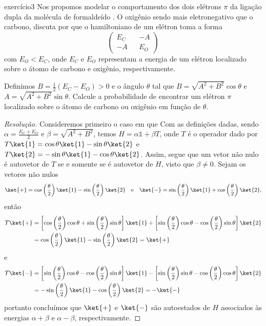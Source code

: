 \begin{exercício}{}{exercício3}
    Nos propomos modelar o comportamento dos dois elétrons \(\pi\) da ligação dupla da molécula de formaldeído . O oxigênio sendo mais eletronegativo que o carbono, discuta por que o hamiltoniano de um elétron toma a forma
    \begin{equation*}
        \begin{pmatrix}
            E_C && -A\\
            -A &&E_O
        \end{pmatrix}
    \end{equation*}
    com \(E_O < E_C\), onde \(E_C\) e \(E_O\) representam a energia de um elétron localizado sobre o átomo de carbono e oxigênio, respectivamente.

    Definimos \(B = \frac12 (E_C - E_O) > 0\) e o ângulo \(\theta\) tal que \(B = \sqrt{A^2 + B^2}\cos\theta\) e \(A = \sqrt{A^2 + B^2}\sin\theta\). Calcule a probabilidade de encontrar um elétron \(\pi\) localizado sobre o átomo de carbono ou oxigênio em função de \(\theta\).
\end{exercício}
\begin{proof}[Resolução]
    Consideremos primeiro o caso em que
    Com as definições dadas, sendo \(\alpha = \frac{E_C + E_O}{2}\) e \(\beta = \sqrt{A^2 + B^2}\), temos \(H = \alpha \mathds{1} + \beta T\), onde \(T\) é o operador dado por \(T\ket{1} = \cos\theta \ket{1} - \sin\theta \ket{2}\) e \(T\ket{2} = -\sin\theta\ket{1} - \cos\theta\ket{2}\). Assim, segue que um vetor não nulo é autovetor de \(T\) se e somente se é autovetor de \(H\), visto que \(\beta \neq 0\). Sejam os vetores não nulos
    \begin{equation*}
        \ket{+} = \cos\left(\frac{\theta}{2}\right)\ket{1} - \sin\left(\frac{\theta}{2}\right)\ket{2}
        \quad\text{e}\quad
        \ket{-} = \sin\left(\frac{\theta}{2}\right)\ket{1} + \cos\left(\frac{\theta}{2}\right)\ket{2},
    \end{equation*}
    então
    \begin{align*}
        T\ket{+} &= \left[\cos\left(\frac{\theta}{2}\right)\cos\theta + \sin\left(\frac{\theta}{2}\right)\sin\theta\right]\ket{1} + \left[\sin\left(\frac{\theta}{2}\right)\cos\theta - \cos\left(\frac{\theta}{2}\right)\sin\theta\right]\ket{2}\\
                 &= \cos\left(\frac{\theta}{2}\right)\ket{1} - \sin\left(\frac{\theta}{2}\right) \ket{2} = \ket{+}
    \end{align*}
    e
    \begin{align*}
        T\ket{-} &= \left[\sin\left(\frac{\theta}{2}\right)\cos\theta - \cos\left(\frac{\theta}{2}\right)\sin\theta\right]\ket{1} - \left[\sin\left(\frac{\theta}{2}\right)\sin\theta - \cos\left(\frac{\theta}{2}\right)\cos\theta\right]\ket{2}\\
                 &= -\sin\left(\frac{\theta}{2}\right)\ket{1} - \cos\left(\frac{\theta}{2}\right) \ket{2} = -\ket{-}
    \end{align*}
    portanto concluímos que \(\ket{+}\) e \(\ket{-}\) são autoestados de \(H\) associados às energias \(\alpha + \beta\) e \(\alpha - \beta\), respectivamente.
\end{proof}
